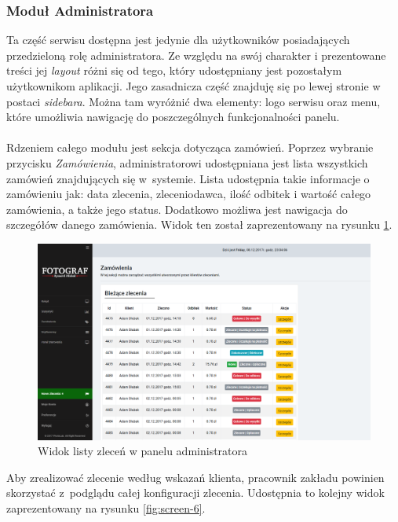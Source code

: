 \newpage




\newpage

\vspace*{0.01\baselineskip}


\subsubsection{Moduł Administratora}
\quad Ta część serwisu dostępna jest jedynie dla użytkowników posiadających przedzieloną rolę administratora. Ze względu na swój charakter i prezentowane treści jej \textit{layout} różni się od tego, który udostępniany jest pozostałym użytkownikom aplikacji. Jego zasadnicza część znajduję się po lewej stronie w postaci \textit{sidebara}. Można tam wyróżnić dwa elementy: logo serwisu oraz menu, które umożliwia nawigację do poszczególnych funkcjonalności panelu.\\
\\
Rdzeniem całego modułu jest sekcja dotycząca zamówień. Poprzez wybranie przycisku \textit{Zamówienia}, administratorowi udostępniana jest lista wszystkich zamówień znajdujących się w~systemie. Lista udostępnia takie informacje o zamówieniu jak: data zlecenia, zleceniodawca, ilość odbitek i wartość całego zamówienia, a także jego status. Dodatkowo możliwa jest nawigacja do szczegółów danego zamówienia. Widok ten został zaprezentowany na rysunku \ref{fig:screen-5}.


\begin{figure}[ht]
	\centering
	\includegraphics[width=0.9\linewidth]{graphics/chapter-4/screen-5.png}
	\caption{Widok listy zleceń w panelu administratora}
	\label{fig:screen-5}
\end{figure}

\noindent Aby zrealizować zlecenie według wskazań klienta, pracownik zakładu powinien skorzystać z~podglądu całej konfiguracji zlecenia. Udostępnia to kolejny widok zaprezentowany na rysunku \ref{fig:screen-6}.


